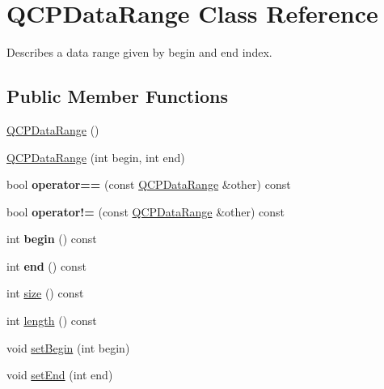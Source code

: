 \hypertarget{class_q_c_p_data_range}{}\section{Q\+C\+P\+Data\+Range Class Reference}
\label{class_q_c_p_data_range}


Describes a data range given by begin and end index.  


\subsection*{Public Member Functions}
\begin{DoxyCompactItemize}
\item 
\hyperlink{class_q_c_p_data_range_a49e72fd9bace1da9d875136dcc04c986}{Q\+C\+P\+Data\+Range} ()
\item 
\hyperlink{class_q_c_p_data_range_a6c7f4a3684210423270515403060e9cf}{Q\+C\+P\+Data\+Range} (int begin, int end)
\item 
\mbox{\label{class_q_c_p_data_range_a8bfd79a282f6ebd766d60caa683242d3}} 
bool {\bfseries operator==} (const \hyperlink{class_q_c_p_data_range}{Q\+C\+P\+Data\+Range} \&other) const
\item 
\mbox{\label{class_q_c_p_data_range_a5bcc9597731a7455407853ed0585f6ab}} 
bool {\bfseries operator!=} (const \hyperlink{class_q_c_p_data_range}{Q\+C\+P\+Data\+Range} \&other) const
\item 
\mbox{\label{class_q_c_p_data_range_ae76d7eba9defdfafcd0fc41096793129}} 
int {\bfseries begin} () const
\item 
\mbox{\label{class_q_c_p_data_range_aee1b20fb045929c3753ee2ce14af7630}} 
int {\bfseries end} () const
\item 
int \hyperlink{class_q_c_p_data_range_ac6af055e509d1b691c244954ff1c5887}{size} () const
\item 
int \hyperlink{class_q_c_p_data_range_a1e7836058f755c6ab9f11996477b7150}{length} () const
\item 
void \hyperlink{class_q_c_p_data_range_a54ff59048e01e46ac4aefafc844626c6}{set\+Begin} (int begin)
\item 
void \hyperlink{class_q_c_p_data_range_a277f1a9eafe70b9184d9c00b641ae5de}{set\+End} (int end)

\end{DoxyCompactItemize}
